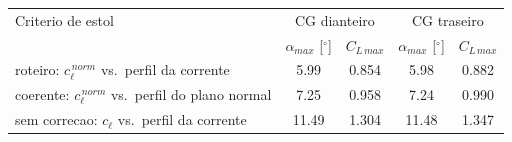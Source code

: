\begin{tabular}{lcccc}
\toprule
Criterio de estol & \multicolumn{2}{c}{CG dianteiro} & \multicolumn{2}{c}{CG traseiro} \\
& $\alpha_{max}$ [$^\circ$] & $C_{L\,max}$ & $\alpha_{max}$ [$^\circ$] & $C_{L\,max}$ \\
\midrule
roteiro: $c_\ell^{\,norm}$ vs.\ perfil da corrente & 5.99 & 0.854 & 5.98 & 0.882 \\
coerente: $c_\ell^{\,norm}$ vs.\ perfil do plano normal & 7.25 & 0.958 & 7.24 & 0.990 \\
sem correcao: $c_\ell$ vs.\ perfil da corrente & 11.49 & 1.304 & 11.48 & 1.347 \\
\bottomrule
\end{tabular}
